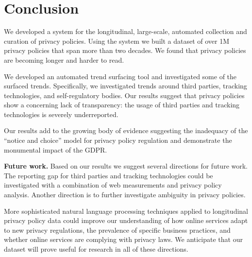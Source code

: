 \section{Conclusion}
\label{sec:ppot:conclusion}
We developed a system for the longitudinal, large-scale, automated collection and curation of privacy policies. Using the system we built a dataset of over 1M privacy policies that span more than two decades. We found that privacy policies are becoming longer and harder to read.

We developed an automated trend surfacing tool and investigated some of the surfaced trends. Specifically, we investigated trends around third parties, tracking technologies, and self-regulatory bodies. Our results suggest that privacy policies show a concerning lack of transparency: the usage of third parties and tracking technologies is severely underreported.

Our results add to the growing body of evidence suggesting the inadequacy of the ``notice and choice'' model for privacy policy regulation and demonstrate the monumental impact of the GDPR.






\textbf{Future work.}
Based on our results we suggest several directions for future work. The reporting gap for third parties and tracking technologies could be investigated with a combination of web measurements and privacy policy analysis. Another direction is to further investigate ambiguity in privacy policies.

More sophisticated natural language processing techniques applied to longitudinal privacy policy data could improve our understanding of how online services adapt to new privacy regulations, the prevalence of specific business practices, and whether online services are complying with privacy laws. 
We anticipate that our dataset will prove useful for research in all of these directions.
